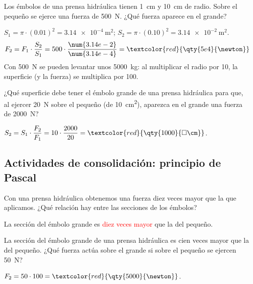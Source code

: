 \begin{example}
    Los émbolos de una prensa hidráulica tienen \qty{1}{\cm} y \qty{10}{\cm} de radio. Sobre el pequeño se ejerce una fuerza de \qty{500}{\newton}. ¿Qué fuerza aparece en el grande?

    \(S_1 = \pi \cdot (\num{0.01})^2 = \qty{3.14e-4}{\square\m}\); \quad \(S_2 = \pi \cdot (\num{0.10})^2 = \qty{3.14e-2}{\square\m}\).
    \[ F_2 = F_1 \cdot \frac{S_2}{S_1} = 500 \cdot \frac{\num{3.14e-2}}{\num{3.14e-4}} = \textcolor{red}{\qty{5e4}{\newton}} \]
    Con \qty{500}{\newton} se pueden levantar unos \qty{5000}{\kg}: al multiplicar el radio por 10, la superficie (y la fuerza) se multiplica por 100.
\end{example}

\begin{exercise}
    ¿Qué superficie debe tener el émbolo grande de una prensa hidráulica para que, al ejercer \qty{20}{\newton} sobre el pequeño (de \qty{10}{\square\cm}), aparezca en el grande una fuerza de \qty{2000}{\newton}?
    \begin{solu}
        \(S_2 = S_1 \cdot \dfrac{F_2}{F_1} = 10 \cdot \dfrac{2000}{20} = \textcolor{red}{\qty{1000}{\square\cm}}\).
    \end{solu}
\end{exercise}

\subsection*{Actividades de consolidación: principio de Pascal}

\begin{exercise}
    Con una prensa hidráulica obtenemos una fuerza diez veces mayor que la que aplicamos. ¿Qué relación hay entre las secciones de los émbolos?
    \begin{solu}
        La sección del émbolo grande es \textcolor{red}{diez veces mayor} que la del pequeño.
    \end{solu}
\end{exercise}

\begin{exercise}
    La sección del émbolo grande de una prensa hidráulica es cien veces mayor que la del pequeño. ¿Qué fuerza actúa sobre el grande si sobre el pequeño se ejercen \qty{50}{\newton}?
    \begin{solu}
        \(F_2 = 50 \cdot 100 = \textcolor{red}{\qty{5000}{\newton}}\).
    \end{solu}
\end{exercise}

